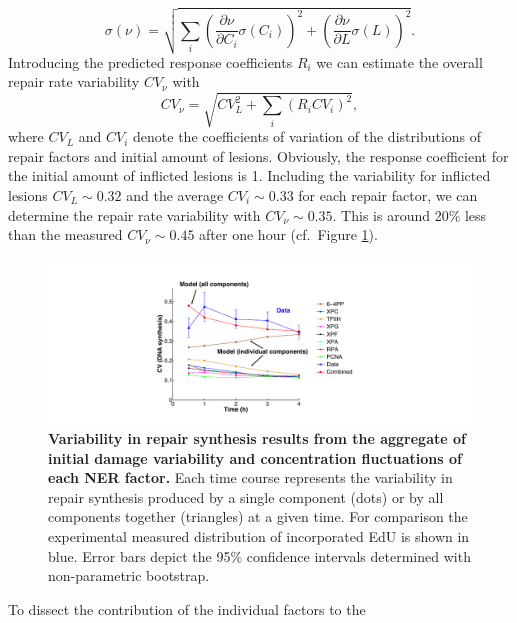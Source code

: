 \begin{equation}
\sigma(\nu) = \sqrt{\sum_{i}\left(\frac{\partial \nu}{\partial C_i}\sigma(C_i) \right)^2 + \left(\frac{\partial \nu}{\partial L}\sigma(L)\right)^2 }.
\label{eqn:lawoferrorPropagation}
\end{equation} 
Introducing the predicted response coefficients $R_i$ we can estimate the overall repair rate variability $CV_{\nu}$ with
\begin{equation}
CV_{\nu} = \sqrt{CV_{L}^2 + \sum_{i}(R_iCV_i)^2},
\label{eqn:lawOfErrorPropI}
\end{equation}
where $CV_{L}$ and $CV_i$ denote the coefficients of variation of the distributions of repair factors and initial amount of lesions. Obviously, the response coefficient for the initial amount of inflicted lesions is 1. Including the variability for inflicted lesions $CV_L \sim 0.32$ and the average $CV_i \sim 0.33$ for each repair factor, we can determine the repair rate variability with $CV_{\nu} \sim 0.35$. This is around 20\% less than the measured $CV_{\nu} \sim 0.45$ after one hour (cf.\ Figure \ref{fig:CV_Var_comp}).\\
\begin{figure}[b!]
	\begin{center}
		\includegraphics[width=1\textwidth]{Abbildungen/figure3_8.pdf}
		\caption{\textbf{Variability in repair synthesis results from the aggregate of initial damage variability and concentration fluctuations of each NER factor.} Each time course represents the variability in repair synthesis produced by a single component (dots) or by all components together (triangles) at a given time. For comparison the experimental measured distribution of incorporated EdU is shown in blue. Error bars depict the 95\% confidence intervals determined with non-parametric bootstrap.}
		\label{fig:CV_Var_comp}
	\end{center}
\end{figure}
\noindent To dissect the contribution of the individual factors to the
